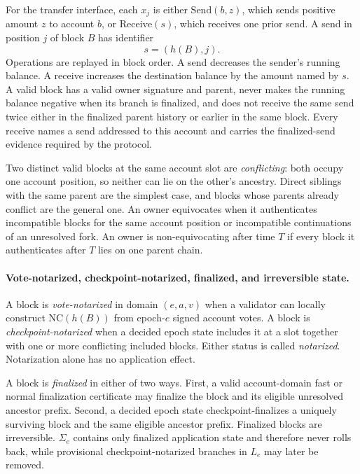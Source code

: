 \documentclass[10pt,twocolumn]{article}
\newcommand{\NC}{\mathrm{NC}}
\begin{document}
For the transfer interface, each $x_j$ is either $\mathrm{Send}(b,z)$, which sends positive amount $z$ to account $b$, or $\mathrm{Receive}(s)$, which receives one prior send. A send in position $j$ of block $B$ has identifier
\begin{equation}
s=(h(B),j).
\end{equation}
Operations are replayed in block order. A send decreases the sender's running balance. A receive increases the destination balance by the amount named by $s$. A valid block has a valid owner signature and parent, never makes the running balance negative when its branch is finalized, and does not receive the same send twice either in the finalized parent history or earlier in the same block. Every receive names a send addressed to this account and carries the finalized-send evidence required by the protocol.

Two distinct valid blocks at the same account slot are \emph{conflicting}: both occupy one account position, so neither can lie on the other's ancestry. Direct siblings with the same parent are the simplest case, and blocks whose parents already conflict are the general one. An owner equivocates when it authenticates incompatible blocks for the same account position or incompatible continuations of an unresolved fork. An owner is non-equivocating after time $T$ if every block it authenticates after $T$ lies on one parent chain.

\paragraph{Vote-notarized, checkpoint-notarized, finalized, and irreversible state.} A block is \emph{vote-notarized} in domain $(e,a,v)$ when a validator can locally construct $\NC(h(B))$ from epoch-$e$ signed account votes. A block is \emph{checkpoint-notarized} when a decided epoch state includes it at a slot together with one or more conflicting included blocks. Either status is called \emph{notarized}. Notarization alone has no application effect.

A block is \emph{finalized} in either of two ways. First, a valid account-domain fast or normal finalization certificate may finalize the block and its eligible unresolved ancestor prefix. Second, a decided epoch state checkpoint-finalizes a uniquely surviving block and the same eligible ancestor prefix. Finalized blocks are irreversible. $\Sigma_e$ contains only finalized application state and therefore never rolls back, while provisional checkpoint-notarized branches in $L_e$ may later be removed.
\end{document}
